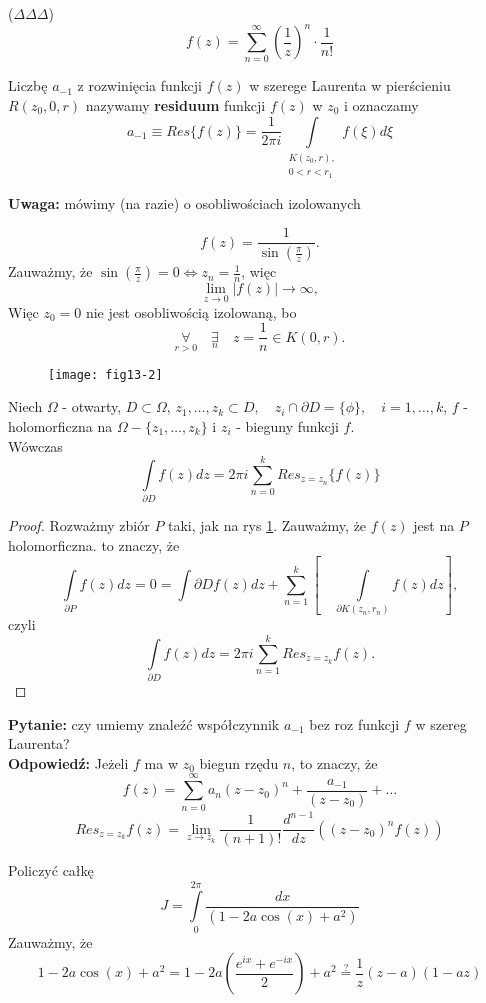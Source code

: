 \documentclass[../main.tex]{subfiles}
\begin{document}
\begin{przyklad}
    ($\Delta\Delta\Delta$)\\
    \[
        f(z) = \sum_{n = 0}^\infty \left(\frac{1}{z}\right)^n \cdot \frac{1}{n!}
    \]
\end{przyklad}
\begin{definicja}
    Liczbę $a_{-1}$ z rozwinięcia funkcji $f(z)$ w szerege Laurenta w pierścieniu $R(z_0, 0, r)$ nazywamy \textbf{residuum} funkcji $f(z)$ w $z_0$ i oznaczamy
    \[
        a_{-1} \equiv Res\{f(z)\} = \frac{1}{2\pi i} \int\limits_{\substack{K(z_0,r),\\ 0<r<r_1}} f(\xi)d\xi
    \]
\end{definicja}
\textbf{Uwaga: } mówimy (na razie) o osobliwościach izolowanych
\begin{przyklad}
    \[
        f(z) = \frac{1}{\sin\left(\frac{\pi}{z}\right)}
    .\]
Zauważmy, że $\sin\left(\frac{\pi}{z}\right) = 0 \iff z_n = \frac{1}{n}$, więc
    \[
        \lim\limits_{z\to 0}|f(z)| \to \infty,
    \]
    Więc $z_0 = 0$ nie jest osobliwością izolowaną, bo
    \[
        \underset{r > 0}{\forall}\quad\underset{n}{\exists}\quad z = \frac{1}{n}\in K(0,r).
    \]
\end{przyklad}
\begin{figure}[h]
    \centering
    \texttt{[image: fig13-2]}
    \label{fig:w13-2}
    \caption{}
\end{figure}
\begin{tw}
Niech $\Omega$ - otwarty, $D\subset \Omega$, $z_1,\dots,z_k\subset D,\quad z_i\cap \partial D = \{\phi\},\quad i = 1,\dots,k$, $f$ - holomorficzna na $\Omega - \{z_1,\dots,z_k\}$ i $z_i$ - bieguny funkcji $f$.\\
Wówczas
    \[
        \int\limits_{\partial D} f(z)dz = 2 \pi i \sum_{n=0}^k Res_{z = z_n}\{f(z)\}
    \]
\end{tw}
\begin{proof}
    Rozważmy zbiór $P$ taki, jak na rys \ref{fig:w13-2}.
    Zauważmy, że $f(z)$ jest na $P$ holomorficzna. to znaczy, że
    \[
        \int\limits_{\partial P}f(z) dz = 0 = \int\limits{\partial D}f(z)dz + \sum_{n=1}^k \left[\quad\int\limits_{\partial K(z_n, r_n)}f(z) dz\right],
    \]
    czyli
    \[
        \int\limits_{\partial D} f(z) dz = 2 \pi i\sum_{n=1}^k Res_{z = z_k} f(z)
    .\]
\end{proof}
\textbf{Pytanie:} czy umiemy znaleźć współczynnik $a_{-1}$ bez roz funkcji $f$ w szereg Laurenta?\\
\textbf{Odpowiedź:} Jeżeli $f$ ma w $z_0$ biegun rzędu $n$, to znaczy, że
\[
    f(z) = \sum_{n=0}^\infty a_n(z-z_0)^n + \frac{a_{-1}}{(z-z_0)} + \dots
\]
\[
    Res_{z = z_k}f(z) = \lim\limits_{z\to z_k} \frac{1}{(n+1)!} \frac{d^{n-1}}{dz}\left((z-z_0)^nf(z)\right)
\]
\begin{przyklad}
    Policzyć całkę
    \[
        J = \int\limits_0^{2\pi} \frac{dx}{(1-2a\cos(x)+a^2)}
    \]
    Zauważmy, że
    \[
        1 - 2a \cos(x) + a^2 = 1 - 2a\left( \frac{e^{ix} + e^{-ix}}{2}\right) + a^2 \overset{?}{=} \frac{1}{z} (z-a)(1-az)
    \]
\end{przyklad}
\end{document}
